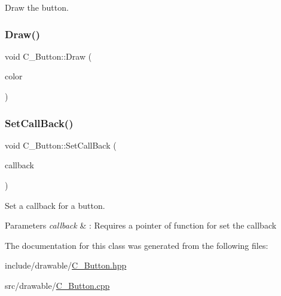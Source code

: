 Draw the button. 

\mbox{\label{classC__Button_a6c507d4567ca21676e9980f8cf3d26b5}} 
\subsubsection{\texorpdfstring{Draw()}{Draw()}\hspace{0.1cm}{\footnotesize\ttfamily [2/2]}}
{\footnotesize\ttfamily void C\+\_\+\+Button\+::\+Draw (\begin{DoxyParamCaption}\item[{M\+L\+V\+\_\+\+Color}]{color }\end{DoxyParamCaption})}

\mbox{\label{classC__Button_aedb01f3229d8176f6a9475cf2edae8f0}} 
\subsubsection{\texorpdfstring{Set\+Call\+Back()}{SetCallBack()}}
{\footnotesize\ttfamily void C\+\_\+\+Button\+::\+Set\+Call\+Back (\begin{DoxyParamCaption}\item[{std\+::function$<$ int(int)$>$}]{callback }\end{DoxyParamCaption})}



Set a callback for a button. 


\begin{DoxyParams}{Parameters}
{\em callback} & \+: Requires a pointer of function for set the callback \\
\hline
\end{DoxyParams}


The documentation for this class was generated from the following files\+:\begin{DoxyCompactItemize}
\item 
include/drawable/\hyperlink{C__Button_8hpp}{C\+\_\+\+Button.\+hpp}\item 
src/drawable/\hyperlink{C__Button_8cpp}{C\+\_\+\+Button.\+cpp}\end{DoxyCompactItemize}
